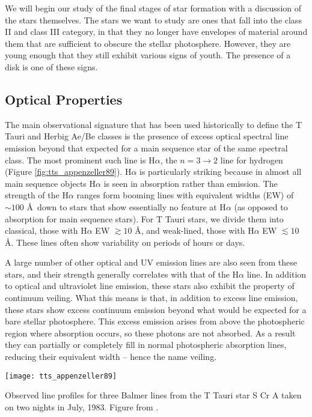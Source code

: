 We will begin our study of the final stages of star formation with a discussion of the stars themselves. The stars we want to study are ones that fall into the class II and class III category, in that they no longer have envelopes of material around them that are sufficient to obscure the stellar photosphere. However, they are young enough that they still exhibit various signs of youth. The presence of a disk is one of these signs.

\subsection{Optical Properties}

The main observational signature that has been used historically to define the T Tauri and Herbig Ae/Be classes is the presence of excess optical spectral line emission beyond that expected for a main sequence star of the same spectral class. The most prominent such line is H$\alpha$, the $n=3\rightarrow 2$ line for hydrogen (Figure \ref{fig:tts_appenzeller89}). H$\alpha$ is particularly striking because in almost all main sequence objects H$\alpha$ is seen in absorption rather than emission. The strength of the H$\alpha$ ranges form booming lines with equivalent widths (EW) of $\sim 100$ \AA\ down to stars that show essentially no feature at H$\alpha$ (as opposed to absorption for main sequence stars). For T Tauri stars, we divide them into classical, those with H$\alpha$ EW $\gtrsim 10$ \AA, and weak-lined, those with H$\alpha$ EW $\lesssim 10$ \AA. These lines often show variability on periods of hours or days.

A large number of other optical and UV emission lines are also seen from these stars, and their strength generally correlates with that of the H$\alpha$ line. In addition to optical and ultraviolet line emission, these stars also exhibit the property of continuum veiling. What this means is that, in addition to excess line emission, these stars show excess continuum emission beyond what would be expected for a bare stellar photosphere. This excess emission arises from above the photospheric region where absorption occurs, so these photons are not absorbed. As a result they can partially or completely fill in normal photospheric absorption lines, reducing their equivalent width -- hence the name veiling.

\begin{marginfigure}
\texttt{[image: tts\_appenzeller89]}
\caption[Balmer lines of T Tauri stars]{
\label{fig:tts_appenzeller89}
Observed line profiles for three Balmer lines from the T Tauri star S Cr A taken on two nights in July, 1983. Figure from \citet{appenzeller89a}.
}
\end{marginfigure}

